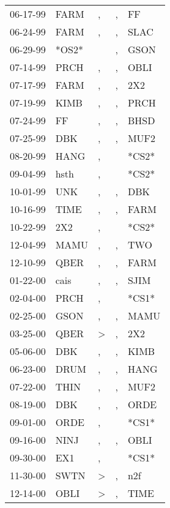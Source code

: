 \begin{supertabular}{lllll}
 06-17-99 &   FARM &             , &  , &     FF \\
 06-24-99 &   FARM &             , &  , &   SLAC \\
 06-29-99 &  *OS2* &               &  , &   GSON \\
 07-14-99 &   PRCH &             , &  , &   OBLI \\
 07-17-99 &   FARM &             , &  , &    2X2 \\
 07-19-99 &   KIMB &             , &  , &   PRCH \\
 07-24-99 &     FF &             , &  , &   BHSD \\
 07-25-99 &    DBK &             , &  , &   MUF2 \\
 08-20-99 &   HANG &             , &    &  *CS2* \\
 09-04-99 &   hsth &             , &    &  *CS2* \\
 10-01-99 &    UNK &             , &  , &    DBK \\
 10-16-99 &   TIME &             , &  , &   FARM \\
 10-22-99 &    2X2 &             , &    &  *CS2* \\
 12-04-99 &   MAMU &             , &  , &    TWO \\
 12-10-99 &   QBER &             , &  , &   FARM \\
 01-22-00 &   cais &             , &  , &   SJIM \\
 02-04-00 &   PRCH &             , &    &  *CS1* \\
 02-25-00 &   GSON &             , &  , &   MAMU \\
 03-25-00 &   QBER &  \textgreater &  , &    2X2 \\
 05-06-00 &    DBK &             , &  , &   KIMB \\
 06-23-00 &   DRUM &             , &  , &   HANG \\
 07-22-00 &   THIN &             , &  , &   MUF2 \\
 08-19-00 &    DBK &             , &  , &   ORDE \\
 09-01-00 &   ORDE &             , &    &  *CS1* \\
 09-16-00 &   NINJ &             , &  , &   OBLI \\
 09-30-00 &    EX1 &             , &    &  *CS1* \\
 11-30-00 &   SWTN &  \textgreater &  , &    n2f \\
 12-14-00 &   OBLI &  \textgreater &  , &   TIME \\

\end{supertabular}
